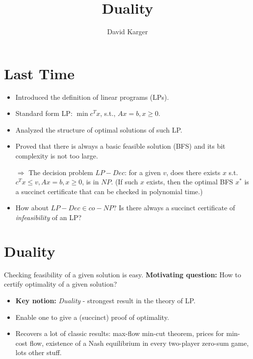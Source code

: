 \documentclass{article}
\title{Duality}
\author{David Karger}
\begin{document}
\section{Last Time}

\begin{itemize}
\item Introduced the definition of linear programs (LPs). 
\item Standard form LP: $\min c^Tx$, s.t., $Ax=b, x\geq 0$. 
\item Analyzed the structure of optimal solutions of such LP. 
\item Proved that there is always a basic feasible solution (BFS) and its bit complexity is not too large.

$\Rightarrow$ The decision problem $LP-Dec$: for a given $v$, does there exists $x$ s.t. $c^Tx\leq v, Ax=b, x\geq 0$, is in $NP$.
(If such $x$ exists, then the optimal BFS $x^*$ is a succinct certificate that can be checked in polynomial time.)
\item How about $LP-Dec\in co-NP$? Is there always a succinct certificate of {\em infeasibility} of an LP?
\end{itemize}

\section{Duality}

Checking feasibility of a given solution is easy.
\textbf{Motivating question:} How to certify optimality of a given solution?
\begin{itemize}
\item \textbf{Key notion:} {\em Duality} - strongest result in the theory of LP.
\item Enable one to give a (succinct) proof of optimality.
\item Recovers a lot of classic results: max-flow min-cut theorem, prices for min-cost flow, existence of a Nash equilibrium in every two-player zero-sum game,
  lots other stuff.
\end{itemize}
\end{document}
